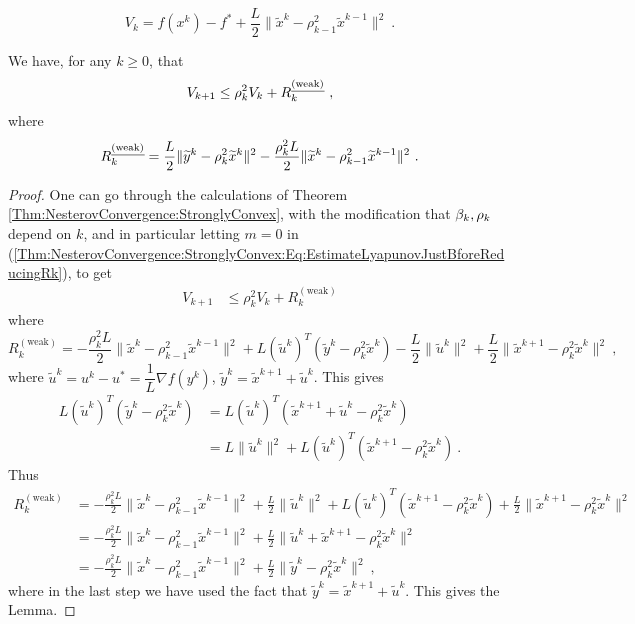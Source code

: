 $$V_k=f(x^k)-f^*+\dfrac{L}{2}\|\widetilde{x}^k-\rho_{k-1}^2\widetilde{x}^{k-1}\|^2 \ .$$

\begin{lemma}\label{Lm:NesterovConvergence:WeaklyConvexRecursion}
We have, for any $k\geq 0$, that
\begin{equation}\label{Lm:NesterovConvergence:WeaklyConvexRecursion:Eq:Recursion}
V_{k+1}\leq \rho_k^2 V_k+R_k^{\emph{\text{(weak)}}} \ ,
\end{equation}
where 
\begin{equation}\label{Lm:NesterovConvergence:WeaklyConvexRecursion:Eq:WeakRk}
R_k^{\emph{\text{(weak)}}}=\dfrac{L}{2}\|\widetilde{y}^k-\rho_k^2\widetilde{x}^k\|^2
-\dfrac{\rho_k^2 L}{2}\|\widetilde{x}^k-\rho_{k-1}^2\widetilde{x}^{k-1}\|^2 \ .
\end{equation}
\end{lemma}

\begin{proof}
One can go through the calculations of Theorem \ref{Thm:NesterovConvergence:StronglyConvex}, with the modification that $\beta_k, \rho_k$ depend on $k$, and in particular letting $m=0$ in (\ref{Thm:NesterovConvergence:StronglyConvex:Eq:EstimateLyapunovJustBforeReducingRk}), to get
\begin{align*}
V_{k+1}
&\le \rho_k^2 V_k + R_k^{(\mathrm{weak})} 
\end{align*}
where
$$
R_k^{(\mathrm{weak})}
=
-\frac{\rho_k^2 L}{2}\|\tilde x^k-\rho_{k-1}^2\tilde x^{k-1}\|^2 
+L(\tilde u^k)^T(\tilde y^k-\rho_k^2\tilde x^k)
-\frac{L}{2}\|\tilde u^k\|^2
+\frac{L}{2}\|\tilde x^{k+1}-\rho_k^2\tilde x^k\|^2 \ ,
$$
where $
\tilde u^k = u^k-u^* = \dfrac{1}{L}\nabla f(y^k)
$, $\tilde y^k=\tilde x^{k+1}+\tilde u^k$. This gives
\begin{align*}
L(\tilde u^k)^T(\tilde y^k-\rho_k^2\tilde x^k)
&=
L(\tilde u^k)^T(\tilde x^{k+1}+\tilde u^k-\rho_k^2\tilde x^k) \\
&=
L\|\tilde u^k\|^2
+
L(\tilde u^k)^T(\tilde x^{k+1}-\rho_k^2\tilde x^k) \ .
\end{align*}
Thus
\begin{align*}
R_k^{(\mathrm{weak})}
&=
-\frac{\rho_k^2 L}{2}\|\tilde x^k-\rho_{k-1}^2\tilde x^{k-1}\|^2
+\frac{L}{2}\|\tilde u^k\|^2 +L(\tilde u^k)^T(\tilde x^{k+1}-\rho_k^2\tilde x^k)
+\frac{L}{2}\|\tilde x^{k+1}-\rho_k^2\tilde x^k\|^2 \\
&=
-\frac{\rho_k^2 L}{2}\|\tilde x^k-\rho_{k-1}^2\tilde x^{k-1}\|^2
+\frac{L}{2}\|\tilde u^k+\tilde x^{k+1}-\rho_k^2\tilde x^k\|^2 \\
&=
-\frac{\rho_k^2 L}{2}\|\tilde x^k-\rho_{k-1}^2\tilde x^{k-1}\|^2
+\frac{L}{2}\|\tilde y^k-\rho_k^2\tilde x^k\|^2 \ ,
\end{align*}
where in the last step we have used the fact that $\tilde y^k=\tilde x^{k+1}+\tilde u^k$. This gives the Lemma.
\end{proof}

